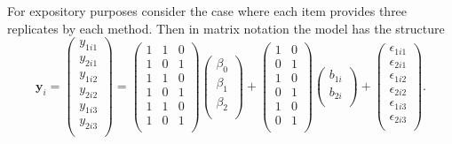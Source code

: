 \documentclass[12pt, a4paper]{report}
\theoremstyle{plain}
\theoremstyle{definition}
\theoremstyle{remark}
\begin{document}
\bigskip

For expository purposes consider the case where each item provides three replicates by each method. Then in matrix notation the model has the structure
\[
\boldsymbol{y}_{i} =
\left(
\begin{array}{c}
y_{1i1} \\
y_{2i1} \\
y_{1i2} \\
y_{2i2} \\
y_{1i3} \\
y_{2i3} \\
\end{array}
\right) = 
\left(
\begin{array}{ccc}
1 & 1 & 0 \\
1 & 0 & 1 \\
1 & 1 & 0 \\
1 & 0 & 1 \\
1 & 1 & 0 \\
1 & 0 & 1 \\
\end{array}
\right)
\left(
\begin{array}{c}
\beta_0 \\ \beta_1 \\ \beta_2 \\
\end{array}
\right)
+
\left(
\begin{array}{cc}
1 & 0 \\
0 & 1 \\
1 & 0 \\
0 & 1 \\
1 & 0 \\
0 & 1 \\
\end{array}
\right)\left(
\begin{array}{c}
b_{1i} \\   b_{2i} \\
\end{array}
\right)
+
\left(
\begin{array}{c}
\epsilon_{1i1} \\
\epsilon_{2i1} \\
\epsilon_{1i2} \\
\epsilon_{2i2} \\
\epsilon_{1i3} \\
\epsilon_{2i3} \\
\end{array}
\right).
\]
\end{document}
